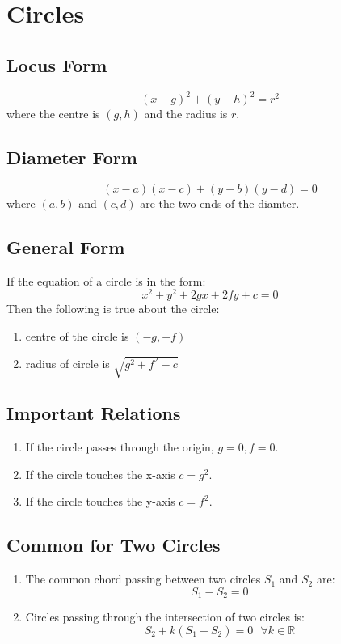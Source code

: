 \large{\chapter{Circles}}

\section{Locus Form}
\begin{equation}
	(x-g)^2+(y-h)^2=r^2
\end{equation}
where the centre is $(g,h)$ and the radius is $r$.

\section{Diameter Form}
\begin{equation}
	(x-a)(x-c)+(y-b)(y-d)=0
\end{equation}
where $(a,b)$ and $(c,d)$ are the two ends of the diamter.

\section{General Form}
If the equation of a circle is in the form:
\begin{equation}
	x^2+y^2+2gx+2fy+c=0
\end{equation}
Then the following is true about the circle:
\begin{enumerate}
	\item centre of the circle is $(-g,-f)$
	\item radius of circle is $\sqrt{g^2+f^2-c}$
\end{enumerate}

\section{Important Relations}
\begin{enumerate}
	\item If the circle passes through the origin, $g=0,f=0$.
	\item If the circle touches the x-axis $c=g^2$.
	\item If the circle touches the y-axis $c=f^2$.
\end{enumerate}

\section*{Common for Two Circles}
\begin{enumerate}
	\item The common chord passing between two circles $S_1$ and $S_2$ are:
	\begin{equation}
		S_1-S_2=0
	\end{equation}
	\item Circles passing through the intersection of two circles is:
	\begin{equation}
		S_2+k(S_1-S_2)=0\text{ }\forall k\in\mathbb{R}
	\end{equation}
\end{enumerate}
